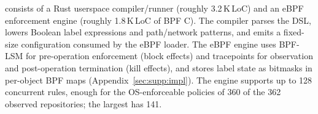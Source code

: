 \sys{} consists of a Rust userspace compiler/runner (roughly 3.2\,K\,LoC) and an eBPF enforcement engine (roughly 1.8\,K\,LoC of BPF C).
The compiler parses the DSL, lowers Boolean label expressions and path/network patterns, and emits a fixed-size configuration consumed by the eBPF loader.
The eBPF engine uses BPF-LSM for pre-operation enforcement (block effects) and tracepoints for observation and post-operation termination (kill effects), and stores label state as bitmasks in per-object BPF maps (Appendix~\ref{sec:supp:impl}).
The engine supports up to 128 concurrent rules, enough for the OS-enforceable policies of 360 of the 362 observed repositories; the largest has 141.
